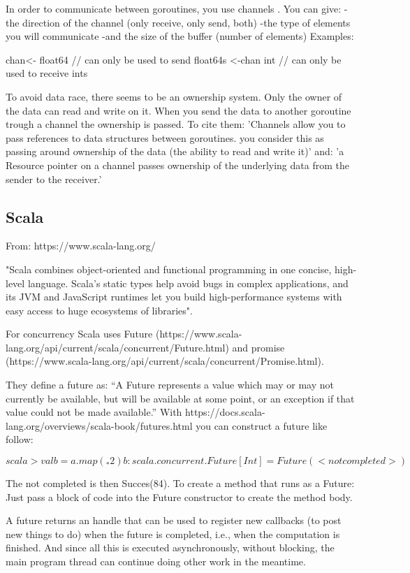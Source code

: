 \documentclass[11pt]{article} %
\begin{document}
In order to communicate between goroutines, you use channels .
You can give:
-the direction of the channel (only receive, only send, both)
-the type of elements you will communicate
-and the size of the buffer (number of elements)
Examples:

chan<- float64  // can only be used to send float64s
<-chan int      // can only be used to receive ints

To avoid data race, there seems to be an ownership system. Only the owner of the data can read and write on it. 
When you send the data to another goroutine trough a channel the ownership is passed. 
To cite them: 
'Channels allow you to pass references to data structures between goroutines.
you consider this as passing around ownership of the data (the ability to read and write it)' 
and:
'a Resource pointer on a channel passes ownership of the underlying data from the sender to the receiver.'

\subsection{Scala}
From: https://www.scala-lang.org/

"Scala combines object-oriented and functional programming in one concise, high-level language. Scala's static types help avoid bugs in complex applications, and its JVM and JavaScript runtimes let you build high-performance systems with easy access to huge ecosystems of libraries".

For concurrency Scala uses Future  (https://www.scala-lang.org/api/current/scala/concurrent/Future.html) and promise (https://www.scala-lang.org/api/current/scala/concurrent/Promise.html).


They define a future as: “A Future represents a value which may or may not currently be available, but will be available at some point, or an exception if that value could not be made available.”
With https://docs.scala-lang.org/overviews/scala-book/futures.html you can construct a future like follow:

$scala> val b = a.map(_ * 2)
b: scala.concurrent.Future[Int] = Future(<not completed>)$

The not completed is then Succes(84). To create a method that runs as a Future: Just pass a block of code into the Future constructor to create the method body.

A future returns an handle that can be used to register new callbacks (to post new things to do) when the future is completed, i.e., when the computation is finished. And since all this is executed asynchronously, without blocking, the main program
 thread can continue doing other work in the meantime. 
\end{document}
